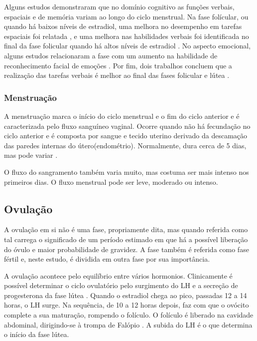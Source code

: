 Alguns estudos demonstraram que no domínio cognitivo 
as funções verbais, espaciais e de memória variam ao longo do ciclo 
menstrual. Na fase folícular, ou quando há baixos níveis de estradiol, 
uma melhora no desempenho em tarefas espaciais foi relatada 
\cite{hausmann2000,maki2002, courvoisier2013, becker1982, phillips1992}, 
e uma melhora nas habilidades verbais foi identificada 
no final da fase folicular quando há altos níveis de estradiol 
\cite{Rosenberg2002}. No aspecto emocional, alguns estudos relacionaram a 
fase com um aumento na habilidade de reconhecimento facial de emoções 
\cite{derntl2013}. Por fim, dois trabalhos concluem que a realização das tarefas verbais é melhor 
ao final das fases folicular e lútea \cite{Rosenberg2002, solis2004}.


\subsubsection{Menstruação}

A menstruação marca o início do ciclo menstrual e o fim do ciclo anterior 
e é caracterizada pelo fluxo sanguíneo vaginal. Ocorre quando não há 
fecundação no ciclo anterior e é composta por sangue e tecido uterino 
derivado da descamação das paredes internas do útero(endométrio). 
Normalmente, dura cerca de 5 dias, mas pode variar \cite{guyton2012}.

O fluxo do sangramento também varia muito, mas costuma ser mais intenso nos primeiros dias. O fluxo menstrual pode ser leve, moderado ou intenso.

\subsection{Ovulação}

A ovulação em si não é uma fase, propriamente dita, mas quando referida 
como tal carrega o significado de um período estimado em que há a 
possível liberação do óvulo e maior probabilidade de gravidez. 
A fase também é referida como fase fértil e, neste estudo, é dividida em 
outra fase por sua importância.

A ovulação acontece pelo equilíbrio entre vários hormonios. 
Clinicamente é possível determinar o ciclo ovulatório pelo surgimento do 
LH e a secreção de progesterona da fase lútea \cite{fritz2010}. 
Quando o estradiol chega ao pico, passadas 12 a 14 horas, o LH surge. 
Na sequência, de 10 a 12 horas depois, faz com que o ovócito complete a 
sua maturação, rompendo o folículo. O folículo é liberado na cavidade 
abdominal, dirigindo-se à trompa de Falópio \cite{fritz2010}. 
A subida do LH é o que determina o início da fase lútea.

